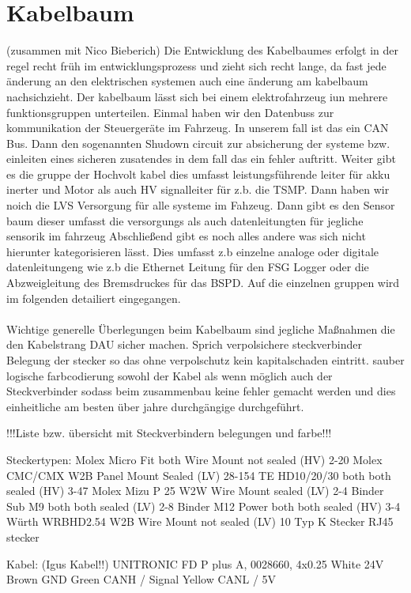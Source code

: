 \section{Kabelbaum} (zusammen mit Nico Bieberich)
Die Entwicklung des Kabelbaumes erfolgt in der regel recht früh im entwicklungsprozess und zieht sich recht lange, da fast jede änderung an den elektrischen systemen auch eine änderung am kabelbaum nachsichzieht. Der kabelbaum lässt sich bei einem elektrofahrzeug iun mehrere funktionsgruppen unterteilen. Einmal haben wir den Datenbuss zur kommunikation der Steuergeräte im Fahrzeug. In unserem fall ist das ein CAN Bus. Dann den sogenannten Shudown circuit zur absicherung der systeme bzw. einleiten eines sicheren zusatendes in dem fall das ein fehler auftritt. Weiter gibt es die gruppe der Hochvolt kabel dies umfasst leistungsführende leiter für akku inerter und Motor als auch HV signalleiter für z.b. die TSMP. Dann haben wir noich die LVS Versorgung für alle systeme im Fahzeug. Dann gibt es den Sensor baum dieser umfasst die versorgungs als auch datenleitungten für jegliche sensorik im fahrzeug  Abschließend gibt es noch alles andere was sich nicht hierunter kategorisieren lässt. Dies umfasst z.b einzelne analoge oder digitale datenleitungeng wie z.b die Ethernet Leitung für den FSG Logger oder die Abzweigleitung des Bremsdruckes für das BSPD. Auf die einzelnen gruppen wird im folgenden detailiert eingegangen.\\
\\
Wichtige generelle Überlegungen beim Kabelbaum sind jegliche Maßnahmen die den Kabelstrang DAU sicher machen. Sprich verpolsichere steckverbinder Belegung der stecker so das ohne verpolschutz kein kapitalschaden eintritt. sauber logische farbcodierung sowohl der Kabel als wenn möglich auch der Steckverbinder sodass beim zusammenbau keine fehler gemacht werden und dies einheitliche am besten über jahre durchgängige durchgeführt.

!!!Liste bzw. übersicht mit Steckverbindern belegungen und farbe!!!

Steckertypen:		
Molex Micro Fit 	both 	Wire Mount	not sealed 	(HV)	2-20
Molex CMC/CMX 		W2B 	Panel Mount	Sealed 		(LV)	28-154
TE HD10/20/30 		both 	both		sealed 		(HV)	3-47
Molex Mizu P 25 	W2W 	Wire Mount	sealed 		(LV)	2-4
Binder Sub M9 		both 	both		sealed 		(LV)	2-8
Binder M12 Power	both	both		sealed		(HV) 	3-4
Würth WRBHD2.54		W2B	Wire Mount	not sealed	(LV)	10
Typ K Stecker
RJ45 stecker

Kabel: (Igus Kabel!!)
UNITRONIC FD P plus A, 0028660, 4x0.25
White 24V
Brown GND
Green CANH / Signal
Yellow CANL / 5V

